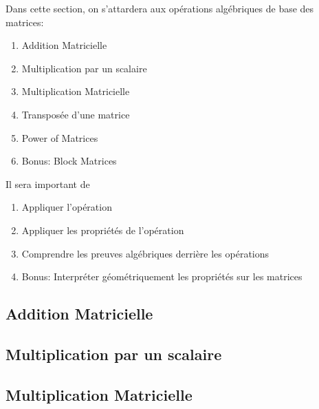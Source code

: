 \documentclass{article}
\begin{document}
Dans cette section, on s'attardera aux opérations algébriques de base des
matrices:
\begin{enumerate}
    \item Addition Matricielle
    \item Multiplication par un scalaire
    \item Multiplication Matricielle
    \item Transposée d'une matrice
    \item Power of Matrices
    \item Bonus: Block Matrices
\end{enumerate}

Il sera important de
\begin{enumerate}
    \item Appliquer l'opération
    \item Appliquer les propriétés de l'opération
    \item Comprendre les preuves algébriques derrière les opérations
    \item Bonus: Interpréter géométriquement les propriétés sur les matrices
\end{enumerate}

\subsection{Addition Matricielle}

\begin{definition}
\end{definition}

\begin{theorem}
\end{theorem}

\subsection{Multiplication par un scalaire}

\begin{definition}
\end{definition}

\begin{theorem}
\end{theorem}

\subsection{Multiplication Matricielle}
\end{document}
